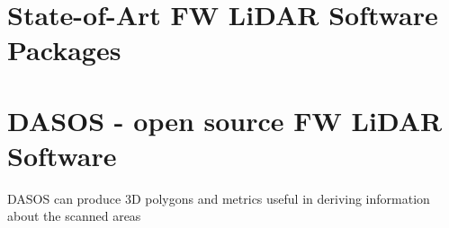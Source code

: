 \documentclass{subfiles}
\begin{document}
	
	
	\section{State-of-Art FW LiDAR Software Packages}
	
	\section{DASOS - open source FW LiDAR Software}
	
	   	DASOS can produce 3D polygons and metrics useful in deriving information about the scanned areas
	   	
	   	
\end{document}
